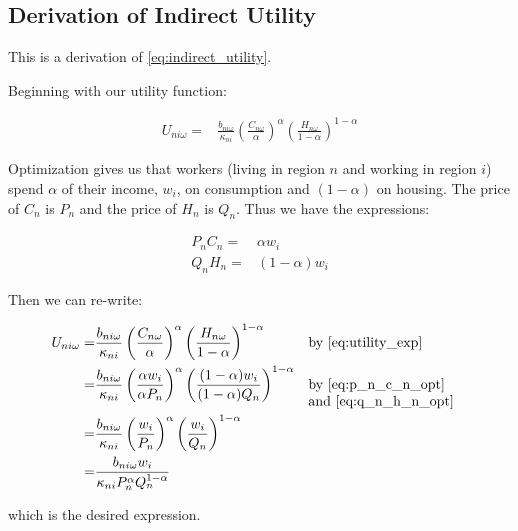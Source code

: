 \documentclass[10pt]{article}
\begin{document}

\subsection{Derivation of Indirect Utility}
\label{sec:indirect_utility}

This is a derivation of \eqref{eq:indirect_utility}.

Beginning with our utility function:

\begin{align}
    U_{n i \omega}=&\frac{b_{n i \omega}}{\kappa_{n i}}\left(\frac{C_{n \omega}}{\alpha}\right)^\alpha\left(\frac{H_{n \omega}}{1-\alpha}\right)^{1-\alpha}
\end{align}

Optimization gives us that workers (living in region $n$ and working in 
region $i$) spend $\alpha$
of their income, $w_i$, on consumption and $(1-\alpha)$ on housing.
The price of $C_n$ is $P_n$ and the price of $H_n$ is $Q_n$.
Thus we have the expressions:

\begin{align}
    P_n C_n = &\alpha w_i \label{eq:p_n_c_n_opt} \\
    Q_n H_n = &(1-\alpha) w_i \label{eq:q_n_h_n_opt}
\end{align}

Then we can re-write:

\begin{align}
    U_{n i \omega}=&\frac{b_{n i \omega}}{\kappa_{n i}}\left(\frac{C_{n \omega}}{\alpha}\right)^\alpha\left(\frac{H_{n \omega}}{1-\alpha}\right)^{1-\alpha} && \parbox[t]{4cm}{\raggedright by \eqref{eq:utility_exp}} \\
    = &\frac{b_{n i \omega}}{\kappa_{n i}}\left(\frac{\alpha w_i}{\alpha P_n}\right)^\alpha\left(\frac{(1-\alpha) w_i}{(1-\alpha) Q_n}\right)^{1-\alpha} && \parbox[t]{4cm}{\raggedright by \eqref{eq:p_n_c_n_opt} and \eqref{eq:q_n_h_n_opt}} \\
    = &\frac{b_{n i \omega}}{\kappa_{n i}}\left(\frac{w_i}{P_n}\right)^\alpha\left(\frac{w_i}{Q_n}\right)^{1-\alpha} \\
    = &\frac{b_{n i \omega} w_i}{\kappa_{n i} P_n^\alpha Q_n^{1-\alpha}}
\end{align}

which is the desired expression.
\end{document}
